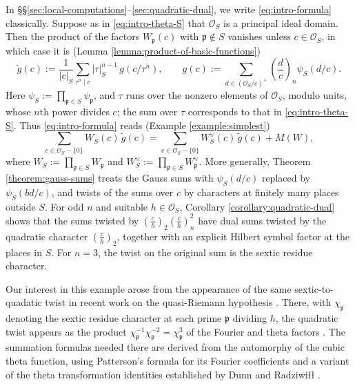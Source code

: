 \documentclass[reqno]{amsart}
\newcommand{\qr}[2]{\left( \frac{#1}{#2} \right)}
\theoremstyle{plain}
\theoremstyle{definition}
\theoremstyle{itplain}
\numberwithin{equation}{section}
\numberwithin{theorem}{section}
\begin{document}
In \S\S\ref{sec:local-computations}--\ref{sec:quadratic-dual}, we write \eqref{eq:intro-formula} classically.  Suppose as in \eqref{eq:intro-theta-S} that $\mathcal{O}_S$ is a principal ideal domain.  Then the product of the factors $W_{\mathfrak{p}}(c)$ with $\mathfrak{p} \notin S$ vanishes unless $c \in \mathcal{O}_S$, in which case it is (Lemma \ref{lemma:product-of-basic-functions})
\begin{equation*}
  \tilde{g}(c) := \frac{1}{\lvert c \rvert_S} \sum_{\tau^n \mid c} \lvert \tau \rvert_S^{n-1} \, g(c / \tau^n),
  \qquad
  g(c) := \sum_{d \in (\mathcal{O}_S / c)^\times} \qr{d}{c}_n \psi_S(d / c).
\end{equation*}
Here $\psi_S := \prod_{\mathfrak{p} \in S} \psi_{\mathfrak{p}}$, and $\tau$ runs over the nonzero elements of $\mathcal{O}_S$, modulo units, whose $n$th power divides $c$; the sum over $\tau$ corresponds to that in \eqref{eq:intro-theta-S}.  Thus \eqref{eq:intro-formula} reads (Example \ref{example:simplest})
\begin{equation*}
  \sum_{c \in \mathcal{O}_S - \{0\}} W_S(c) \, \tilde{g}(c)
  =
  \sum_{c \in \mathcal{O}_S - \{0\}} W_S^\vee(c) \, \tilde{g}(c)
  + M(W),
\end{equation*}
where $W_S := \prod_{\mathfrak{p} \in S} W_{\mathfrak{p}}$ and $W_S^\vee := \prod_{\mathfrak{p} \in S} W_{\mathfrak{p}}^\vee$.  More generally, Theorem \ref{theorem:gauss-sums} treats the Gauss sums with $\psi_S(d / c)$ replaced by $\psi_S(b d / c)$, and twists of the sums over $c$ by characters at finitely many places outside $S$.  For odd $n$ and suitable $h \in \mathcal{O}_S$, Corollary \ref{corollary:quadratic-dual} shows that the sums twisted by $\qr{c}{h}_2 \qr{c}{h}_n^2$ have dual sums twisted by the quadratic character $\qr{c}{h}_2$, together with an explicit Hilbert symbol factor at the places in $S$.  For $n = 3$, the twist on the original sum is the sextic residue character.

Our interest in this example arose from the appearance of the same sextic-to-quadatic twist in recent work on the quasi-Riemann hypothesis \cite{OpenAI2026QuasiRHOctober5}.  There, with $\chi_{\mathfrak{p}}$ denoting the sextic residue character at each prime $\mathfrak{p}$ dividing $h$, the quadratic twist appears as the product $\chi_{\mathfrak{p}}^{-1} \chi_{\mathfrak{p}}^{-2} = \chi_{\mathfrak{p}}^3$ of the Fourier and theta factors \cite[(2.14)]{OpenAI2026QuasiRHOctober5}.  The summation formulas needed there are derived from the automorphy of the cubic theta function, using Patterson's formula for its Fourier coefficients \cite{Patterson1977CubicTheta} and a variant of the theta transformation identities established by Dunn and Radziwi\l\l{} \cite[\S5]{MR4816436}.
\end{document}
